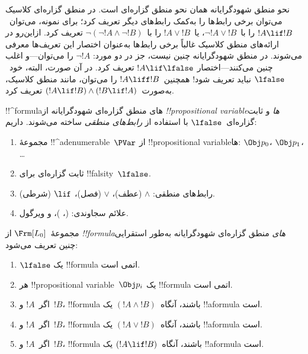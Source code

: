 \documentclass[../../../include/open-logic-section]{subfiles}
\begin{document}


نحو منطق شهودگرایانه همان نحو منطق گزاره‌ای است. در منطق گزاره‌ای
کلاسیک می‌توان برخی رابط‌ها را به‌کمک رابط‌های دیگر تعریف کرد؛ برای
نمونه، می‌توان~$!A \lif !B$ را با~$\lnot !A \lor !B$، یا~$!A \lor !B$
را با~$\lnot(\lnot !A \land \lnot !B)$ تعریف کرد. ازاین‌رو در
ارائه‌های منطق کلاسیک غالباً برخی رابط‌ها به‌عنوان اختصار این تعریف‌ها
معرفی می‌شوند. در منطق شهودگرایانه چنین نیست، جز در دو مورد:
$\lnot !A$ را می‌توان---و اغلب چنین می‌کنند---اختصار
$!A \lif \lfalse$ تعریف کرد. در آن صورت، البته، خود~$\lfalse$ نباید
تعریف شود!{} همچنین~$!A \liff !B$ را می‌توان، مانند منطق کلاسیک،
به‌صورت~$(!A \lif !B) \land (!B \lif !A)$ تعریف کرد.

!!^{formula}های منطق گزاره‌ای شهودگرایانه از
\emph{!!{propositional variable}ها} و ثابت گزاره‌ای~$\lfalse$ با
استفاده از \emph{رابط‌های منطقی} ساخته می‌شوند. داریم:

\begin{enumerate}
\item مجموعهٔ !!^a{denumerable}~$\PVar$ از !!{propositional variable}ها:
  $\Obj p_0$، $\Obj p_1$، \dots
\item ثابت گزاره‌ای برای !!{falsity}~$\lfalse$.
\item رابط‌های منطقی: $\land$ (عطف)، $\lor$ (فصل)، $\lif$
  (شرطی).
\item علائم سجاوندی: (، )، و ویرگول.
\end{enumerate}

\begin{defn}[فرمول]
 مجموعهٔ~$\Frm[L_0]$ از
\emph{!!{formula}های} منطق گزاره‌ای شهودگرایانه به‌طور استقرایی چنین
تعریف می‌شود:
\begin{enumerate}
\item $\lfalse$ یک !!{formula} اتمی است.

\item هر !!{propositional variable}~$\Obj p_i$ یک !!{formula} اتمی
است.

\item اگر~$!A$ و~$!B$، !!{formula} باشند، آنگاه~$(!A \land !B)$ یک
!!a{formula} است.

\item اگر~$!A$ و~$!B$، !!{formula} باشند، آنگاه~$(!A \lor !B)$ یک
!!a{formula} است.

\item اگر~$!A$ و~$!B$، !!{formula} باشند، آنگاه~$(!A \lif !B)$ یک
!!a{formula} است.

\end{enumerate}
\end{defn}
\end{document}
